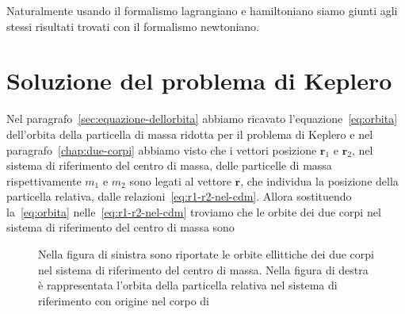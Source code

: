 {Naturalmente usando il formalismo lagrangiano e hamiltoniano siamo giunti agli
stessi risultati trovati con il formalismo newtoniano.

\section{Soluzione del problema di Keplero}
\label{sec:soluzione-problema}

Nel paragrafo~\ref{sec:equazione-dellorbita} abbiamo ricavato
l'equazione~\eqref{eq:orbita} dell'orbita della particella di massa ridotta per
il problema di Keplero e nel paragrafo~\ref{chap:due-corpi} abbiamo visto che
i vettori posizione $\bm{r}_1$ e $\bm{r}_2$, nel sistema di riferimento del
centro di massa, delle particelle di massa rispettivamente $m_1$ e $m_2$ sono
legati al vettore $\bm{r}$, che individua la posizione della particella
relativa, dalle relazioni~\eqref{eq:r1-r2-nel-cdm}. Allora sostituendo
la~\eqref{eq:orbita} nelle~\eqref{eq:r1-r2-nel-cdm} troviamo che le orbite dei
due corpi nel sistema di riferimento del centro di massa sono
\begin{figure}
  \centering
  \quad
  \caption[Soluzione del problema di Keplero]{Nella figura di sinistra sono
    riportate le orbite ellittiche dei due corpi nel sistema di riferimento del
    centro di massa. Nella figura di destra è rappresentata l'orbita della
    particella relativa nel sistema di riferimento con origine nel corpo di
}
\end{figure}}
